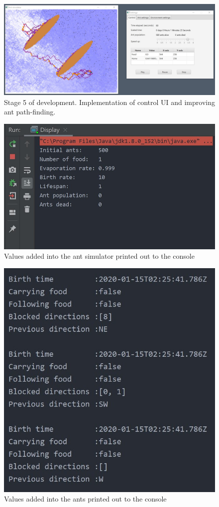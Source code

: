 \documentclass[a4paper, oneside, 11pt]{report}
\begin{document}
\begin{figure}[htb]
	\begin{center}
		\includegraphics[width=1.0 \columnwidth]{Stage_5.jpg}
		\caption{Stage 5 of development. Implementation of control UI and improving ant path-finding.}
		\label{fig:Stage 5}
	\end{center}
\end{figure}

\begin{figure}[htb]
	\begin{center}
		\includegraphics[width=0.6 \columnwidth]{Ant_Simulator_Values.jpg}
		\caption{Values added into the ant simulator printed out to the console}
		\label{fig:Ant_Simulator_Values}
	\end{center}
\end{figure}

\begin{figure}[htb]
	\begin{center}
		\includegraphics[width=0.6 \columnwidth]{Ant_Values.jpg}
		\caption{Values added into the ants printed out to the console}
		\label{fig:Ant_Values}
	\end{center}
\end{figure}
\end{document}
